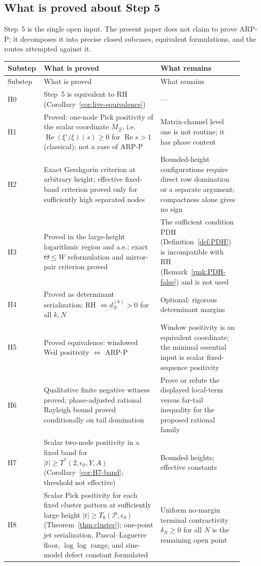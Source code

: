 \documentclass[11pt]{amsart}
\theoremstyle{definition}
\theoremstyle{remark}
\theoremstyle{definition}
\renewcommand{\Re}{\operatorname{Re}}
\begin{document}
\subsection{What is proved about Step 5}\label{subsec:live-step5}

Step~5 is the single open input.  The present paper does not claim to prove ARP-P; it decomposes it
into precise closed subcases, equivalent formulations, and the routes attempted against it.

\begin{longtable}{@{}p{0.10\linewidth}p{0.48\linewidth}p{0.34\linewidth}@{}}
\toprule
Substep & What is proved & What remains \\
\midrule
\endfirsthead
\toprule
Substep & What is proved & What remains \\
\midrule
\endhead
H0 & Step~5 is equivalent to RH (Corollary~\ref{cor:live-equivalence}) & --- \\
H1 & Proved: one-node Pick positivity of the scalar coordinate $M_\Xi$, i.e.\ $\Re(\xi'/\xi)(s)\ge0$ for $\Re s>1$ (classical); not a case of ARP-P & Matrix-channel level one is not routine; it has phase content \\
H2 & Exact Gershgorin criterion at arbitrary height; effective fixed-band criterion proved only for sufficiently high separated nodes & Bounded-height configurations require direct row domination or a separate argument; compactness alone gives no sign \\
H3 & Proved in the large-height logarithmic region and a.e.; exact $\Theta\le W$ reformulation and mirror-pair criterion proved & The sufficient condition PDH (Definition~\ref{def:PDH}) is incompatible with RH (Remark~\ref{rmk:PDH-false}) and is not used \\
H4 & Proved as determinant serialization: RH $\Longleftrightarrow d_N^{(k)}>0$ for all $k,N$ & Optional: rigorous determinant margins \\
H5 & Proved equivalence: windowed Weil positivity $\Longleftrightarrow$ ARP-P & Window positivity is an equivalent coordinate; the minimal essential input is scalar fixed-sequence positivity \\
H6 & Qualitative finite negative witness proved; phase-adjusted rational Rayleigh bound proved conditionally on tail domination & Prove or refute the displayed local-term versus far-tail inequality for the proposed rational family \\
H7 & Scalar two-node positivity in a fixed band for $|t|\ge T^*(2,\epsilon_0,Y,A)$ (Corollary~\ref{cor:H7-band}; threshold not effective) & Bounded heights; effective constants \\
H8 & Scalar Pick positivity for each fixed cluster pattern at sufficiently large height $|t|\ge T_0(\mathcal P,\epsilon_0)$ (Theorem~\ref{thm:cluster}); one-point jet serialization, Pascal--Laguerre floor, $\log\log$ range, and sine-model defect constant formulated & Uniform no-margin terminal contractivity $\delta_N\ge0$ for all $N$ is the remaining open point \\
\bottomrule
\end{longtable}
\end{document}
